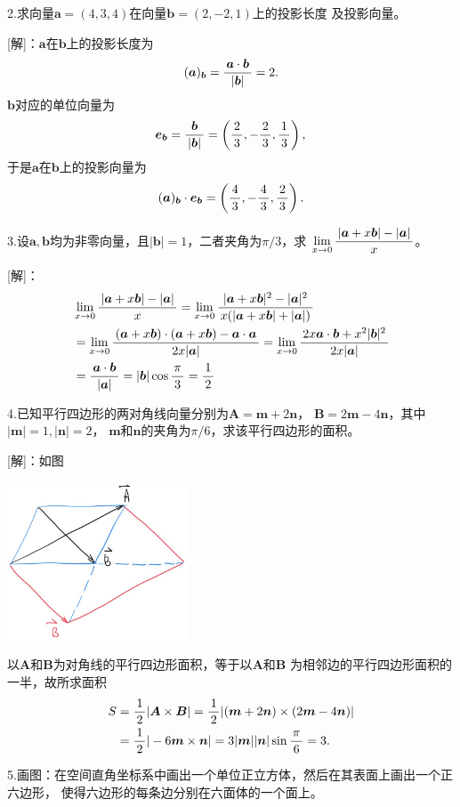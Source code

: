 2.求向量$\bm{a}=(4,3,4)$在向量$\bm{b}=(2,-2,1)$上的投影长度
及投影向量。

[解]：$\bm{a}$在$\bm{b}$上的投影长度为
$$(\bm{a})_{\bm{b}}=\displaystyle\frac{\,{\bm{a}\cdot\bm{b}}\,}{\,{|\bm{b}|}\,}
=2.$$
$\bm{b}$对应的单位向量为
$$\bm{e}_{\bm{b}}=\displaystyle\frac{\,{\bm{b}}\,}{\,{|\bm{b}|}\,}=\left(\displaystyle\frac{\,{2}\,}{\,{3}\,},-\displaystyle\frac{\,{2}\,}{\,{3}\,},\displaystyle\frac{\,{1}\,}{\,{3}\,}\right),$$
于是$\bm{a}$在$\bm{b}$上的投影向量为
$$(\bm{a})_{\bm{b}}\cdot\bm{e}_{\bm{b}}=\left(\displaystyle\frac{\,{4}\,}{\,{3}\,},-\displaystyle\frac{\,{4}\,}{\,{3}\,},\displaystyle\frac{\,{2}\,}{\,{3}\,}\right).$$
\fin

3.设$\bm{a},\bm{b}$均为非零向量，且$|\bm{b}|=1$，二者夹角为$\pi/3$，求
$\lim\limits_{x\to{0}}\displaystyle\frac{\,{|\bm{a}+x\bm{b}|-|\bm{a}|}\,}{\,{x}\,}$。

[解]：
\begin{align*}
	&\lim\limits_{x\to{0}}\displaystyle\frac{\,{|\bm{a}+x\bm{b}|-|\bm{a}|}\,}{\,{x}\,}
	=\lim\limits_{x\to{0}}\displaystyle\frac{\,{|\bm{a}+x\bm{b}|^2-|\bm{a}|^2}\,}{\,{x(|\bm{a}+x\bm{b}|+|\bm{a}|)}\,}\\
	&=\lim\limits_{x\to{0}}\displaystyle\frac{\,{(\bm{a}+x\bm{b})\cdot(\bm{a}+x\bm{b})
	-\bm{a}\cdot\bm{a}}\,}{\,{2x|\bm{a}|}\,}
	=\lim\limits_{x\to{0}}\displaystyle\frac{\,{2x\bm{a}\cdot\bm{b}+x^2|\bm{b}|^2}\,}{\,{2x|\bm{a}|}\,}\\
	&=\displaystyle\frac{\,{\bm{a}\cdot\bm{b}}\,}{\,{|\bm{a}|}\,}=|\bm{b}|\cos\displaystyle\frac{\,{\pi}\,}{\,{3}\,}=\displaystyle\frac{\,{1}\,}{\,{2}\,}
\end{align*}
\fin

4.已知平行四边形的两对角线向量分别为$\bm{A}=\bm{m}+2\bm{n}$，
$\bm{B}=2\bm{m}-4\bm{n}$，其中$|\bm{m}|=1,|\bm{n}|=2$，
$\bm{m}$和$\bm{n}$的夹角为$\pi/6$，求该平行四边形的面积。

[解]：如图
\begin{center}
	\includegraphics[width=0.4\textwidth]{./images/ch8/ABS.jpg}
\end{center}
以$\bm{A}$和$\bm{B}$为对角线的平行四边形面积，等于以$\bm{A}$和$\bm{B}$
为相邻边的平行四边形面积的一半，故所求面积
\begin{align*}
	S&=\displaystyle\frac{\,{1}\,}{\,{2}\,}{|\bm{A}\times\bm{B}|}
	=\displaystyle\frac{\,{1}\,}{\,{2}\,}|(\bm{m}+2\bm{n})\times(2\bm{m}-4\bm{n})|\\
	&=\displaystyle\frac{\,{1}\,}{\,{2}\,}|-6\bm{m}\times\bm{n}|
	=3|\bm{m}||\bm{n}|\sin\displaystyle\frac{\,{\pi}\,}{\,{6}\,}=3.
\end{align*}
\fin

5.画图：在空间直角坐标系中画出一个单位正立方体，然后在其表面上画出一个正六边形，
使得六边形的每条边分别在六面体的一个面上。

